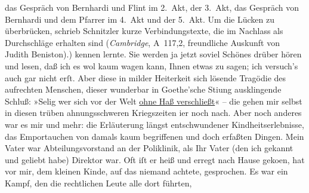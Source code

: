 \begin{ledgroupsized}[t]{13cm}
{{{                  das Gespräch von Bernhardi und Flint im 2. Akt, der 3. Akt, das Gespräch von
                  Bernhardi und dem Pfarrer im 4. Akt und der 5. Akt. Um die Lücken zu überbrücken,
                  schrieb Schnitzler kurze Verbindungstexte,
                  die im Nachlass als Durchschläge erhalten sind (\emph{Cambridge}, A 117,2, freundliche Auskunft von
                  Judith Beniston).}}}\label{K_L02570-1h}) kennen lernte. Sie werden ja jetzt soviel Schönes drüber
               hören und lesen, daß ich es wol kaum wagen kann, Ihnen etwas zu sagen; ich versuch’s
               auch gar nicht erſt. Aber diese in milder Heiterkeit sich lösende Tragödie des
               aufrechten Menschen, dieser wunderbar in Goethe’sche Sti{\geminationm}ung ausklingende Schluß: »Selig wer sich vor der Welt \uline{ohne Haß verschließt}« – {\pb}die gehen mir selbst in diesen trüben
               ahnungsschweren Kriegszeiten i{\geminationm}er noch nach.\pend
           \pstart
           Aber noch anderes war es mir und mehr: die Erläuterung längst entschwundener
               Kindheitserlebnisse, das Emportauchen von damals kaum begriffenen und doch erfaßten
               Dingen. Mein Vater war
               Abteilungsvorstand an der Poliklinik, als Ihr Vater (den ich gekannt und
               geliebt habe) Direktor war. Oft iſt er heiß und erregt nach Hause geko{\geminationm}en, hat vor mir, dem kleinen Kinde, auf das niemand
               achtete, gesprochen. Es war ein Kampf, den die rechtlichen Leute alle dort führten,

\end{ledgroupsized}
